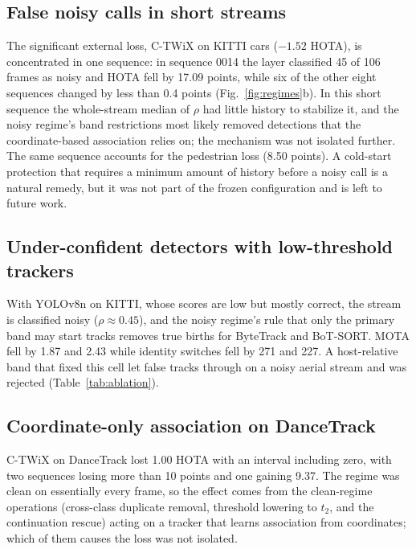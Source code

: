 \documentclass[journal]{new-aiaa}
\begin{document}
\subsection{False noisy calls in short streams}
The significant external loss, C-TWiX on KITTI cars ($-1.52$ HOTA), is concentrated in one sequence: in sequence 0014 the layer classified 45 of 106 frames as noisy and HOTA fell by 17.09 points, while six of the other eight sequences changed by less than 0.4 points (Fig.~\ref{fig:regimes}b). In this short sequence the whole-stream median of $\rho$ had little history to stabilize it, and the noisy regime's band restrictions most likely removed detections that the coordinate-based association relies on; the mechanism was not isolated further. The same sequence accounts for the pedestrian loss (8.50 points). A cold-start protection that requires a minimum amount of history before a noisy call is a natural remedy, but it was not part of the frozen configuration and is left to future work.

\subsection{Under-confident detectors with low-threshold trackers}
With YOLOv8n on KITTI, whose scores are low but mostly correct, the stream is classified noisy ($\rho\approx0.45$), and the noisy regime's rule that only the primary band may start tracks removes true births for ByteTrack and BoT-SORT. MOTA fell by 1.87 and 2.43 while identity switches fell by 271 and 227. A host-relative band that fixed this cell let false tracks through on a noisy aerial stream and was rejected (Table~\ref{tab:ablation}).

\subsection{Coordinate-only association on DanceTrack}
C-TWiX on DanceTrack lost 1.00 HOTA with an interval including zero, with two sequences losing more than 10 points and one gaining 9.37. The regime was clean on essentially every frame, so the effect comes from the clean-regime operations (cross-class duplicate removal, threshold lowering to $t_2$, and the continuation rescue) acting on a tracker that learns association from coordinates; which of them causes the loss was not isolated.
\end{document}
